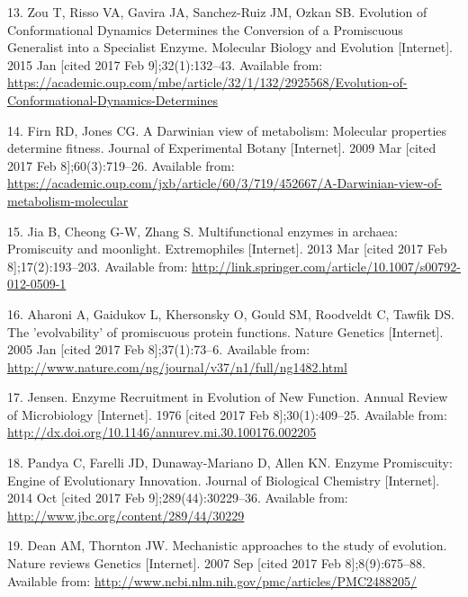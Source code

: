 \documentclass[12pt,twoside]{reedthesis}
\begin{document}
  \hypertarget{ref-zou_evolution_2015}{}
  13. Zou T, Risso VA, Gavira JA, Sanchez-Ruiz JM, Ozkan SB. Evolution of
  Conformational Dynamics Determines the Conversion of a Promiscuous
  Generalist into a Specialist Enzyme. Molecular Biology and Evolution
  {[}Internet{]}. 2015 Jan {[}cited 2017 Feb 9{]};32(1):132--43. Available
  from:
  \url{https://academic.oup.com/mbe/article/32/1/132/2925568/Evolution-of-Conformational-Dynamics-Determines}
  
  \hypertarget{ref-firn_darwinian_2009}{}
  14. Firn RD, Jones CG. A Darwinian view of metabolism: Molecular
  properties determine fitness. Journal of Experimental Botany
  {[}Internet{]}. 2009 Mar {[}cited 2017 Feb 8{]};60(3):719--26. Available
  from:
  \url{https://academic.oup.com/jxb/article/60/3/719/452667/A-Darwinian-view-of-metabolism-molecular}
  
  \hypertarget{ref-jia_multifunctional_2013}{}
  15. Jia B, Cheong G-W, Zhang S. Multifunctional enzymes in archaea:
  Promiscuity and moonlight. Extremophiles {[}Internet{]}. 2013 Mar
  {[}cited 2017 Feb 8{]};17(2):193--203. Available from:
  \url{http://link.springer.com/article/10.1007/s00792-012-0509-1}
  
  \hypertarget{ref-aharoni_evolvability_2005}{}
  16. Aharoni A, Gaidukov L, Khersonsky O, Gould SM, Roodveldt C, Tawfik
  DS. The 'evolvability' of promiscuous protein functions. Nature Genetics
  {[}Internet{]}. 2005 Jan {[}cited 2017 Feb 8{]};37(1):73--6. Available
  from: \url{http://www.nature.com/ng/journal/v37/n1/full/ng1482.html}
  
  \hypertarget{ref-jensen_enzyme_1976}{}
  17. Jensen. Enzyme Recruitment in Evolution of New Function. Annual
  Review of Microbiology {[}Internet{]}. 1976 {[}cited 2017 Feb
  8{]};30(1):409--25. Available from:
  \url{http://dx.doi.org/10.1146/annurev.mi.30.100176.002205}
  
  \hypertarget{ref-pandya_enzyme_2014}{}
  18. Pandya C, Farelli JD, Dunaway-Mariano D, Allen KN. Enzyme
  Promiscuity: Engine of Evolutionary Innovation. Journal of Biological
  Chemistry {[}Internet{]}. 2014 Oct {[}cited 2017 Feb
  9{]};289(44):30229--36. Available from:
  \url{http://www.jbc.org/content/289/44/30229}
  
  \hypertarget{ref-dean_mechanistic_2007}{}
  19. Dean AM, Thornton JW. Mechanistic approaches to the study of
  evolution. Nature reviews Genetics {[}Internet{]}. 2007 Sep {[}cited
  2017 Feb 8{]};8(9):675--88. Available from:
  \url{http://www.ncbi.nlm.nih.gov/pmc/articles/PMC2488205/}
  
\end{document}
